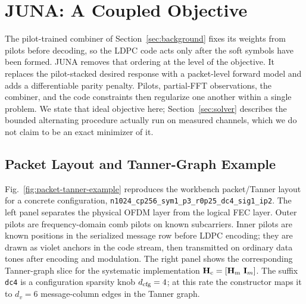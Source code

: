 \documentclass[journal]{IEEEtran}
\newcommand{\cfg}[1]{\texttt{#1}}
\newcommand{\juna}{JUNA}
\newcommand{\Hc}{\mathbf H_{\rm c}}
\newcommand{\Hm}{\mathbf H_{\rm m}}
\begin{document}
\section{JUNA: A Coupled Objective}\label{sec:juna}
The pilot-trained combiner of Section~\ref{sec:background} fixes its weights from
pilots before decoding, so the LDPC code acts only after the soft symbols have
been formed. \juna{} removes that ordering at the level of the objective. It
replaces the pilot-stacked desired response with a packet-level forward model
and adds a differentiable parity penalty. Pilots, partial-FFT observations, the
combiner, and the code constraints then regularize one another within a single
problem. We state that ideal objective here; Section~\ref{sec:solver} describes
the bounded alternating procedure actually run on measured channels, which we do
not claim to be an exact minimizer of it.

\subsection{Packet Layout and Tanner-Graph Example}
\label{ssec:packet-tanner-example}
Fig.~\ref{fig:packet-tanner-example} reproduces the workbench packet/Tanner
layout for a concrete configuration,
\cfg{n1024\_cp256\_sym1\_p3\_r0p25\_dc4\_sig1\_ip2}. The left panel separates
the physical OFDM layer from the logical FEC layer. Outer pilots are
frequency-domain comb pilots on known subcarriers. Inner pilots are known
positions in the serialized message row before LDPC encoding; they are drawn as
violet anchors in the code stream, then transmitted on ordinary data tones after
encoding and modulation. The right panel shows the corresponding Tanner-graph
slice for the systematic implementation $\Hc=[\Hm\ \mathbf I_m]$. The suffix
\cfg{dc4} is a configuration sparsity knob $d_{\rm cfg}=4$; at this rate the
constructor maps it to $d_v=6$ message-column edges in the Tanner graph.
\end{document}
